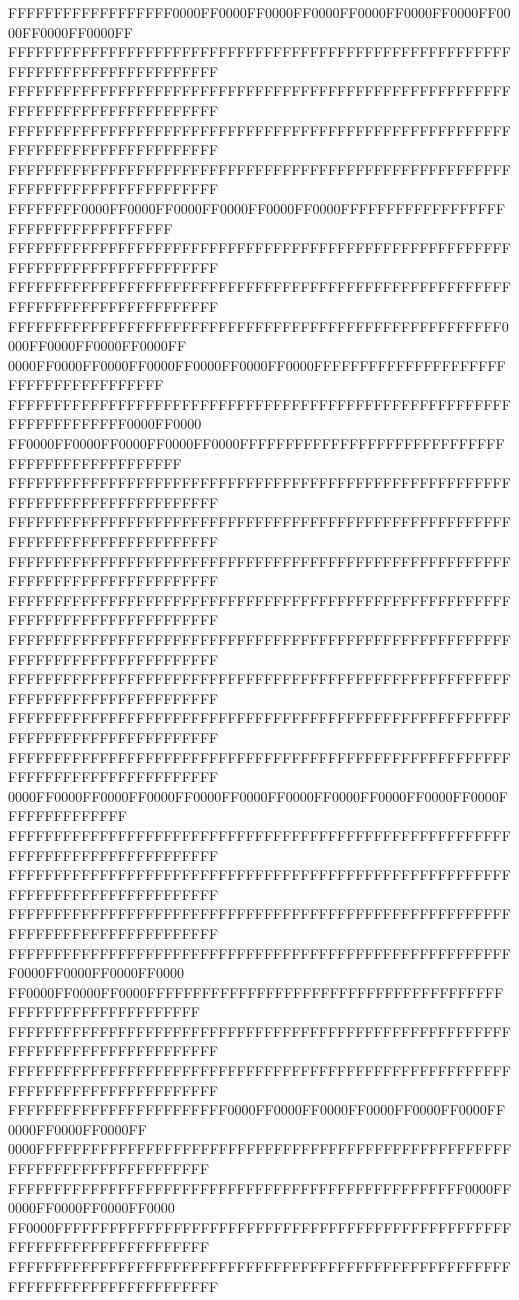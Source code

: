 FFFFFFFFFFFFFFFFFF0000FF0000FF0000FF0000FF0000FF0000FF0000FF0000FF0000FF0000FF
FFFFFFFFFFFFFFFFFFFFFFFFFFFFFFFFFFFFFFFFFFFFFFFFFFFFFFFFFFFFFFFFFFFFFFFFFFFFFF
FFFFFFFFFFFFFFFFFFFFFFFFFFFFFFFFFFFFFFFFFFFFFFFFFFFFFFFFFFFFFFFFFFFFFFFFFFFFFF
FFFFFFFFFFFFFFFFFFFFFFFFFFFFFFFFFFFFFFFFFFFFFFFFFFFFFFFFFFFFFFFFFFFFFFFFFFFFFF
FFFFFFFFFFFFFFFFFFFFFFFFFFFFFFFFFFFFFFFFFFFFFFFFFFFFFFFFFFFFFFFFFFFFFFFFFFFFFF
FFFFFFFF0000FF0000FF0000FF0000FF0000FF0000FFFFFFFFFFFFFFFFFFFFFFFFFFFFFFFFFFFF
FFFFFFFFFFFFFFFFFFFFFFFFFFFFFFFFFFFFFFFFFFFFFFFFFFFFFFFFFFFFFFFFFFFFFFFFFFFFFF
FFFFFFFFFFFFFFFFFFFFFFFFFFFFFFFFFFFFFFFFFFFFFFFFFFFFFFFFFFFFFFFFFFFFFFFFFFFFFF
FFFFFFFFFFFFFFFFFFFFFFFFFFFFFFFFFFFFFFFFFFFFFFFFFFFFFF0000FF0000FF0000FF0000FF
0000FF0000FF0000FF0000FF0000FF0000FF0000FFFFFFFFFFFFFFFFFFFFFFFFFFFFFFFFFFFFFF
FFFFFFFFFFFFFFFFFFFFFFFFFFFFFFFFFFFFFFFFFFFFFFFFFFFFFFFFFFFFFFFFFFFF0000FF0000
FF0000FF0000FF0000FF0000FF0000FFFFFFFFFFFFFFFFFFFFFFFFFFFFFFFFFFFFFFFFFFFFFFFF
FFFFFFFFFFFFFFFFFFFFFFFFFFFFFFFFFFFFFFFFFFFFFFFFFFFFFFFFFFFFFFFFFFFFFFFFFFFFFF
FFFFFFFFFFFFFFFFFFFFFFFFFFFFFFFFFFFFFFFFFFFFFFFFFFFFFFFFFFFFFFFFFFFFFFFFFFFFFF
FFFFFFFFFFFFFFFFFFFFFFFFFFFFFFFFFFFFFFFFFFFFFFFFFFFFFFFFFFFFFFFFFFFFFFFFFFFFFF
FFFFFFFFFFFFFFFFFFFFFFFFFFFFFFFFFFFFFFFFFFFFFFFFFFFFFFFFFFFFFFFFFFFFFFFFFFFFFF
FFFFFFFFFFFFFFFFFFFFFFFFFFFFFFFFFFFFFFFFFFFFFFFFFFFFFFFFFFFFFFFFFFFFFFFFFFFFFF
FFFFFFFFFFFFFFFFFFFFFFFFFFFFFFFFFFFFFFFFFFFFFFFFFFFFFFFFFFFFFFFFFFFFFFFFFFFFFF
FFFFFFFFFFFFFFFFFFFFFFFFFFFFFFFFFFFFFFFFFFFFFFFFFFFFFFFFFFFFFFFFFFFFFFFFFFFFFF
FFFFFFFFFFFFFFFFFFFFFFFFFFFFFFFFFFFFFFFFFFFFFFFFFFFFFFFFFFFFFFFFFFFFFFFFFFFFFF
0000FF0000FF0000FF0000FF0000FF0000FF0000FF0000FF0000FF0000FF0000FFFFFFFFFFFFFF
FFFFFFFFFFFFFFFFFFFFFFFFFFFFFFFFFFFFFFFFFFFFFFFFFFFFFFFFFFFFFFFFFFFFFFFFFFFFFF
FFFFFFFFFFFFFFFFFFFFFFFFFFFFFFFFFFFFFFFFFFFFFFFFFFFFFFFFFFFFFFFFFFFFFFFFFFFFFF
FFFFFFFFFFFFFFFFFFFFFFFFFFFFFFFFFFFFFFFFFFFFFFFFFFFFFFFFFFFFFFFFFFFFFFFFFFFFFF
FFFFFFFFFFFFFFFFFFFFFFFFFFFFFFFFFFFFFFFFFFFFFFFFFFFFFFFF0000FF0000FF0000FF0000
FF0000FF0000FF0000FFFFFFFFFFFFFFFFFFFFFFFFFFFFFFFFFFFFFFFFFFFFFFFFFFFFFFFFFFFF
FFFFFFFFFFFFFFFFFFFFFFFFFFFFFFFFFFFFFFFFFFFFFFFFFFFFFFFFFFFFFFFFFFFFFFFFFFFFFF
FFFFFFFFFFFFFFFFFFFFFFFFFFFFFFFFFFFFFFFFFFFFFFFFFFFFFFFFFFFFFFFFFFFFFFFFFFFFFF
FFFFFFFFFFFFFFFFFFFFFFFF0000FF0000FF0000FF0000FF0000FF0000FF0000FF0000FF0000FF
0000FFFFFFFFFFFFFFFFFFFFFFFFFFFFFFFFFFFFFFFFFFFFFFFFFFFFFFFFFFFFFFFFFFFFFFFFFF
FFFFFFFFFFFFFFFFFFFFFFFFFFFFFFFFFFFFFFFFFFFFFFFFFF0000FF0000FF0000FF0000FF0000
FF0000FFFFFFFFFFFFFFFFFFFFFFFFFFFFFFFFFFFFFFFFFFFFFFFFFFFFFFFFFFFFFFFFFFFFFFFF
FFFFFFFFFFFFFFFFFFFFFFFFFFFFFFFFFFFFFFFFFFFFFFFFFFFFFFFFFFFFFFFFFFFFFFFFFFFFFF
